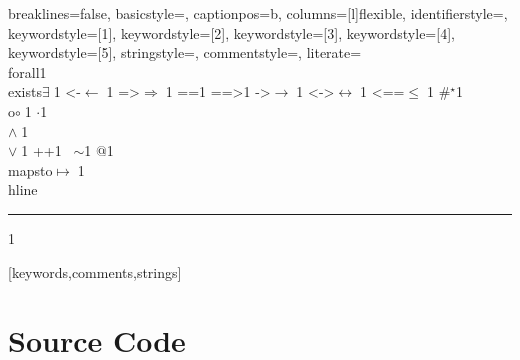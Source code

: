 {    %
    breaklines=false,
    basicstyle=\small,
    captionpos=b,
    columns=[l]flexible,
    identifierstyle={\ttfamily\color{black}},
    keywordstyle=[1]{\ttfamily\color{dkviolet}},
    keywordstyle=[2]{\ttfamily\color{dkgreen}},
    keywordstyle=[3]{\ttfamily\color{ltblue}},
    keywordstyle=[4]{\ttfamily\color{dkblue}},
    keywordstyle=[5]{\ttfamily\color{dkred}},
    stringstyle=\ttfamily,
    commentstyle={\ttfamily\color{dkgreen}},
    literate=
    {\\forall}{{\color{dkgreen}{$\forall\;$}}}1
    {\\exists}{{$\exists\;$}}1
    {<-}{{$\leftarrow\;$}}1
    {=>}{{$\Rightarrow\;$}}1
    {==}{{\code{==}\;}}1
    {==>}{{\code{==>}\;}}1
    {->}{{$\rightarrow\;$}}1
    {<->}{{$\leftrightarrow\;$}}1
    {<==}{{$\leq\;$}}1
    {\#}{{$^\star$}}1 
    {\\o}{{$\circ\;$}}1 
    {\@}{{$\cdot$}}1 
    {\/\\}{{$\wedge\;$}}1
    {\\\/}{{$\vee\;$}}1
    {++}{{\code{++}}}1
    {~}{{$\sim$}}1
    {\@\@}{{$@$}}1
    {\\mapsto}{{$\mapsto\;$}}1
    {\\hline}{{\rule{\linewidth}{0.5pt}}}1
}[keywords,comments,strings]

\section{Source Code}

